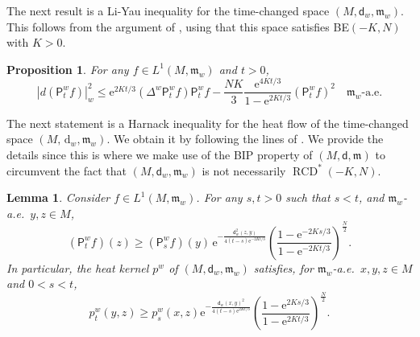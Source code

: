 \documentclass[10pt]{article}
\newcommand{\m}{\mathfrak{m}}
\newcommand{\M}{{\mathit{M}}}
\renewcommand{\d}{\,\mathrm{d}}
\newcommand{\e}{\mathrm{e}}
\DeclareMathOperator{\RCD}{RCD}
\renewcommand{\P}{\mathsf{P}}
\newcommand{\dist}{\mathsf{d}}
\theoremstyle{plain}
\newtheorem{proposition}[theorem]{Proposition}
\newtheorem{lemma}[theorem]{Lemma}
\theoremstyle{definition}
\newcommand{\Lonew}{L^1(M,\m_w)}
\begin{document}
The next result is a Li-Yau inequality for the time-changed space $(M,\dist_w,\m_w)$. This follows from the argument of  \cite[Theorem~1.3]{GarofaloMondino-13}, using that this space satisfies BE$(-K,N)$ with $K> 0$.
\begin{proposition}\label{prop:LiYau}
    For any $f \in \Lonew$ and $t >0$,
\begin{equation*}
| d (\P_t^wf)|_{w}^2\leq \e^{2Kt/3}(\Delta^w\P^w_tf)\P^w_tf-\frac{N K}{3}\frac{ \e^{4Kt/3}}{1-\e^{2Kt/3}}(\P_t^wf)^2 \quad \text{$\m_w$-a.e.}
\end{equation*}
\end{proposition}

The next statement is a Harnack inequality for the heat flow  of the time-changed space $(\M, \d_w, \m_w)$. We obtain it by following the lines of \cite[Theorem 1.4]{GarofaloMondino-13}. We provide the details since this is where we make use of the BIP property of $(M,\dist,\m)$ to circumvent the fact that $(M,\dist_w,\m_w)$ is not necessarily $\RCD^*(-K,N)$.

\begin{lemma}\label{lem:LYtimechange}
Consider $f\in L^1(\M,\m_w)$. For any $s,t>0$ such that $s<t$, and $\m_w$-a.e.~$y,z\in \M$,
\[
(\P_t^wf)(z)\geq (\P_s^wf)(y)\, \e^{-\frac{\dist_w^2(z,y)}{4(t-s)\e^{-2Kt/3}}}\left(\frac{1-\e^{-2Ks/3}}{1-\e^{-2Kt/3}}\right)^{\frac{N}{2}}.
\]
In particular, the heat kernel $p^w$ of
$(\M,\dist_w,\m_w)$ satisfies, for $\m_w$-a.e.~$x,y,z\in\M$ and $0<s<t$,
\[
p_t^w(y,z)\geq p_s^w(x,z)\e^{-\frac{\dist_w(x,y)^2}{4(t-s)\e^{2Kt/3}}}\left(\frac{1-\e^{2Ks/3}}{1-\e^{2Kt/3}}\right)^{\frac{N}{2}}.
\]
\end{lemma}
\end{document}
